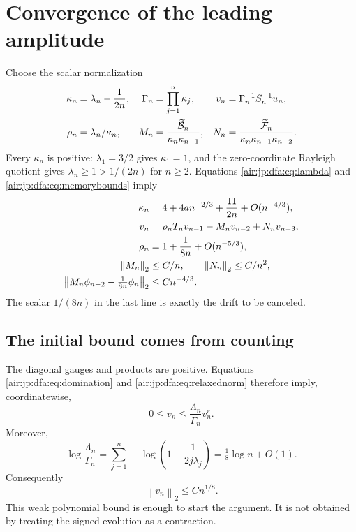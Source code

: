 \documentclass[11pt,letterpaper]{article}
\numberwithin{equation}{section}
\theoremstyle{remark}
\newcommand{\normtwo}[1]{\left\lVert#1\right\rVert_2}
\begin{document}
\section{Convergence of the leading amplitude}\label{air:jp:dfa:sec:leading}
Choose the scalar normalization
\begin{align}
 \kappa_n&=\lambda_n-\frac1{2n},&\Gamma_n&=\prod_{j=1}^n\kappa_j,&
 v_n&=\Gamma_n^{-1}S_n^{-1}u_n,\label{air:jp:dfa:eq:normalize}\\
 \rho_n&=\lambda_n/\kappa_n,&
 M_n&=\frac{\widetilde{\mathcal B}_n}{\kappa_n\kappa_{n-1}},&
 N_n&=\frac{\widetilde{\mathcal F}_n}{\kappa_n\kappa_{n-1}\kappa_{n-2}}.\notag
\end{align}
Every $\kappa_n$ is positive: $\lambda_1=3/2$ gives $\kappa_1=1$, and the zero-coordinate Rayleigh quotient gives $\lambda_n\ge1>1/(2n)$ for $n\ge2$. Equations \eqref{air:jp:dfa:eq:lambda} and \eqref{air:jp:dfa:eq:memorybounds} imply
\begin{align}
 \kappa_n&=4+4an^{-2/3}+\frac{11}{2n}+O(n^{-4/3}),\label{air:jp:dfa:eq:kappa}\\
 v_n&=\rho_nT_nv_{n-1}-M_nv_{n-2}+N_nv_{n-3},\label{air:jp:dfa:eq:normalizedmemory}\\
 \rho_n&=1+\frac1{8n}+O(n^{-5/3}),\notag\\
 \normtwo{M_n}&\le C/n,\qquad \normtwo{N_n}\le C/n^2,\notag\\
 \normtwo{M_n\phi_{n-2}-\tfrac1{8n}\phi_n}&\le Cn^{-4/3}.\label{air:jp:dfa:eq:normalizedbounds}
\end{align}
The scalar $1/(8n)$ in the last line is exactly the drift to be canceled.

\subsection{The initial bound comes from counting}
The diagonal gauges and products are positive. Equations \eqref{air:jp:dfa:eq:domination} and \eqref{air:jp:dfa:eq:relaxednorm} therefore imply, coordinatewise,
\[
 0\le v_n\le\frac{\Lambda_n}{\Gamma_n}v_n^r.
\]
Moreover,
\[
 \log\frac{\Lambda_n}{\Gamma_n}
 =\sum_{j=1}^n-\log\left(1-\frac1{2j\lambda_j}\right)
 =\tfrac18\log n+O(1).
\]
Consequently
\begin{equation}\label{air:jp:dfa:eq:apriori}
 \normtwo{v_n}\le Cn^{1/8}.
\end{equation}
This weak polynomial bound is enough to start the argument. It is not obtained by treating the signed evolution as a contraction.
\end{document}
